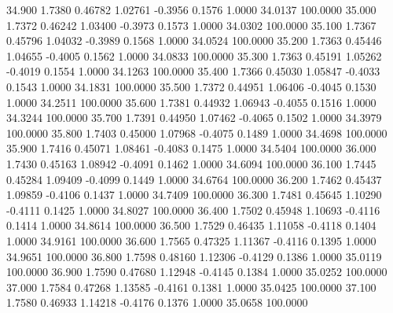   34.900   1.7380   0.46782   1.02761  -0.3956   0.1576   1.0000  34.0137 100.0000
  35.000   1.7372   0.46242   1.03400  -0.3973   0.1573   1.0000  34.0302 100.0000
  35.100   1.7367   0.45796   1.04032  -0.3989   0.1568   1.0000  34.0524 100.0000
  35.200   1.7363   0.45446   1.04655  -0.4005   0.1562   1.0000  34.0833 100.0000
  35.300   1.7363   0.45191   1.05262  -0.4019   0.1554   1.0000  34.1263 100.0000
  35.400   1.7366   0.45030   1.05847  -0.4033   0.1543   1.0000  34.1831 100.0000
  35.500   1.7372   0.44951   1.06406  -0.4045   0.1530   1.0000  34.2511 100.0000
  35.600   1.7381   0.44932   1.06943  -0.4055   0.1516   1.0000  34.3244 100.0000
  35.700   1.7391   0.44950   1.07462  -0.4065   0.1502   1.0000  34.3979 100.0000
  35.800   1.7403   0.45000   1.07968  -0.4075   0.1489   1.0000  34.4698 100.0000
  35.900   1.7416   0.45071   1.08461  -0.4083   0.1475   1.0000  34.5404 100.0000
  36.000   1.7430   0.45163   1.08942  -0.4091   0.1462   1.0000  34.6094 100.0000
  36.100   1.7445   0.45284   1.09409  -0.4099   0.1449   1.0000  34.6764 100.0000
  36.200   1.7462   0.45437   1.09859  -0.4106   0.1437   1.0000  34.7409 100.0000
  36.300   1.7481   0.45645   1.10290  -0.4111   0.1425   1.0000  34.8027 100.0000
  36.400   1.7502   0.45948   1.10693  -0.4116   0.1414   1.0000  34.8614 100.0000
  36.500   1.7529   0.46435   1.11058  -0.4118   0.1404   1.0000  34.9161 100.0000
  36.600   1.7565   0.47325   1.11367  -0.4116   0.1395   1.0000  34.9651 100.0000
  36.800   1.7598   0.48160   1.12306  -0.4129   0.1386   1.0000  35.0119 100.0000
  36.900   1.7590   0.47680   1.12948  -0.4145   0.1384   1.0000  35.0252 100.0000
  37.000   1.7584   0.47268   1.13585  -0.4161   0.1381   1.0000  35.0425 100.0000
  37.100   1.7580   0.46933   1.14218  -0.4176   0.1376   1.0000  35.0658 100.0000
